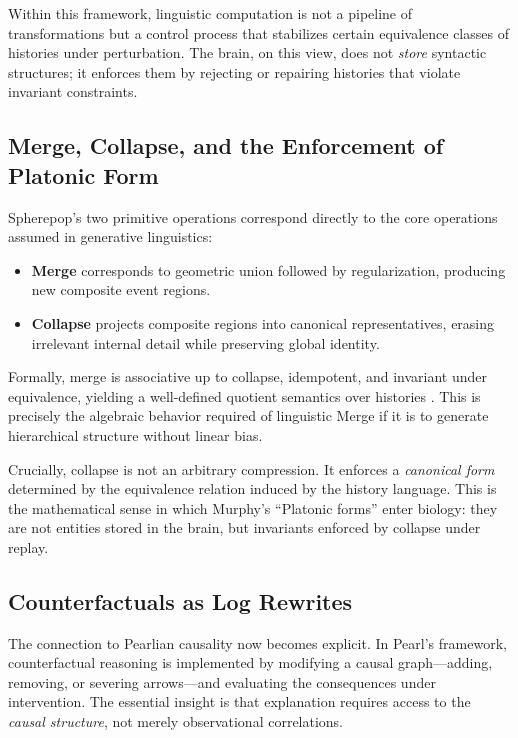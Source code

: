\documentclass[11pt]{article}
\begin{document}
Within this framework, linguistic computation is not a pipeline of transformations but a control process that stabilizes certain equivalence classes of histories under perturbation. The brain, on this view, does not \emph{store} syntactic structures; it enforces them by rejecting or repairing histories that violate invariant constraints.

\subsection{Merge, Collapse, and the Enforcement of Platonic Form}

Spherepop’s two primitive operations correspond directly to the core operations assumed in generative linguistics:

\begin{itemize}
\item \textbf{Merge} corresponds to geometric union followed by regularization, producing new composite event regions.
\item \textbf{Collapse} projects composite regions into canonical representatives, erasing irrelevant internal detail while preserving global identity.
\end{itemize}

Formally, merge is associative up to collapse, idempotent, and invariant under equivalence, yielding a well-defined quotient semantics over histories \cite{turn0file2}. This is precisely the algebraic behavior required of linguistic Merge if it is to generate hierarchical structure without linear bias.

Crucially, collapse is not an arbitrary compression. It enforces a \emph{canonical form} determined by the equivalence relation induced by the history language. This is the mathematical sense in which Murphy’s “Platonic forms” enter biology: they are not entities stored in the brain, but invariants enforced by collapse under replay.

\subsection{Counterfactuals as Log Rewrites}

The connection to Pearlian causality now becomes explicit. In Pearl’s framework, counterfactual reasoning is implemented by modifying a causal graph—adding, removing, or severing arrows—and evaluating the consequences under intervention. The essential insight is that explanation requires access to the \emph{causal structure}, not merely observational correlations.
\end{document}
